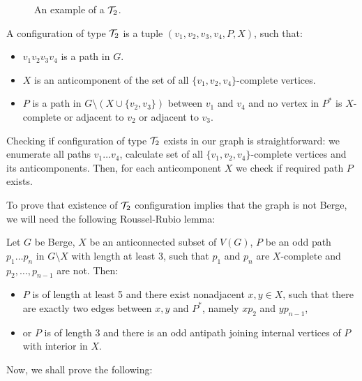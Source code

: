 \begin{wrapfigure}{r}{0.35\textwidth}
	
	\caption{An example of a $\mathcal{T}_2$.}%
	\vspace{-1.5cm}
\end{wrapfigure}

A configuration of type $\mathcal{T}_2$ is a tuple $(v_1, v_2, v_3, v_4, P, X)$, such that:
\begin{itemize}
	\item $v_1v_2v_3v_4$ is a path in $G$.
	\item $X$ is an anticomponent of the set of all $\{v_1, v_2, v_4\}$-complete vertices.
	\item $P$ is a path in $G\setminus(X \cup \{v_2, v_3\})$ between $v_1$ and $v_4$ and no vertex in $P^*$ is $X$-complete or adjacent to $v_2$ or adjacent to $v_3$.
\end{itemize}

Checking if configuration of type $\mathcal{T}_2$ exists in our graph is straightforward: we enumerate all paths $v_1\ldots v_4$, calculate set of all $\{v_1, v_2, v_4\}$-complete vertices and its anticomponents. Then, for each anticomponent $X$ we check if required path $P$ exists.

To prove that existence of $\mathcal{T}_2$ configuration implies that the graph is not Berge, we will need the following Roussel-Rubio lemma:

\begin{lemma}\label{lem:Roussel-Rubio}
	Let $G$ be Berge, $X$ be an anticonnected subset of $V(G)$, $P$ be an odd path $p_1\ldots p_n$ in $G\setminus X$ with length at least 3, such that $p_1$ and $p_n$ are $X$-complete and $p_2, \ldots, p_{n-1}$ are not. Then:
	\begin{itemize}
		\item $P$ is of length at least 5 and there exist nonadjacent $x, y \in X$, such that there are exactly two edges between $x, y$ and $P^*$, namely $xp_2$ and $yp_{n-1}$,
		\item or $P$ is of length 3 and there is an odd antipath joining internal vertices of $P$ with interior in $X$.
	\end{itemize}
\end{lemma}

Now, we shall prove the following:

